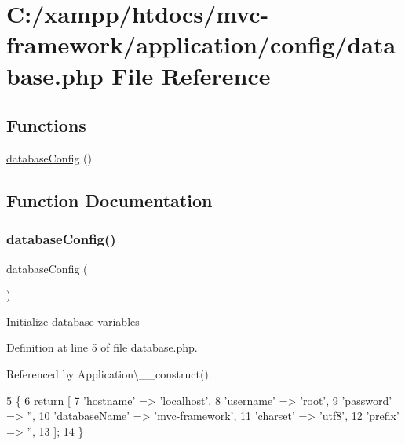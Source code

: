 \hypertarget{database_8php}{}\section{C\+:/xampp/htdocs/mvc-\/framework/application/config/database.php File Reference}
\label{database_8php}
\subsection*{Functions}
\begin{DoxyCompactItemize}
\item 
\hyperlink{database_8php_a87165585cf80e6b4d470b694f7dea4d3}{database\+Config} ()
\end{DoxyCompactItemize}


\subsection{Function Documentation}
\hypertarget{database_8php_a87165585cf80e6b4d470b694f7dea4d3}{}\label{database_8php_a87165585cf80e6b4d470b694f7dea4d3} 
\subsubsection{\texorpdfstring{database\+Config()}{databaseConfig()}}
{\footnotesize\ttfamily database\+Config (\begin{DoxyParamCaption}{ }\end{DoxyParamCaption})}

Initialize database variables 

Definition at line 5 of file database.\+php.



Referenced by Application\textbackslash{}\+\_\+\+\_\+construct().


\begin{DoxyCode}
5                           \{
6     \textcolor{keywordflow}{return} [
7         \textcolor{stringliteral}{'hostname'} => \textcolor{stringliteral}{'localhost'},
8         \textcolor{stringliteral}{'username'} => \textcolor{stringliteral}{'root'},
9         \textcolor{stringliteral}{'password'} => \textcolor{stringliteral}{''},
10         \textcolor{stringliteral}{'databaseName'} => \textcolor{stringliteral}{'mvc-framework'},
11         \textcolor{stringliteral}{'charset'} => \textcolor{stringliteral}{'utf8'},
12         \textcolor{stringliteral}{'prefix'} => \textcolor{stringliteral}{''},
13     ];
14 \}
\end{DoxyCode}
